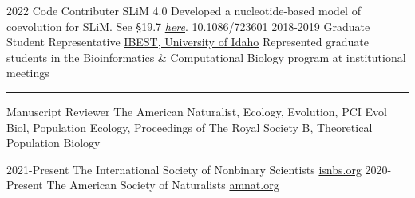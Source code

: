 \documentclass[9pt]{developercv} %
\begin{document}
\vspace{-10 pt}
\begin{publist}
    \pub
    {2022}
    {Code Contributer}
    {SLiM 4.0}
    {Developed a nucleotide-based model of coevolution for SLiM. See §19.7 \href{https://github.com/MesserLab/SLiM/releases/download/v4.0.1/SLiM_Manual.pdf}{\emph{here}}.}
    {10.1086/723601}
    \entry
    {2018-2019}
    {Graduate Student Representative}
    {\href{https://www.iids.uidaho.edu/about.php}{IBEST, University of Idaho}}
    {Represented graduate students in the Bioinformatics \& Computational Biology program at institutional meetings}
    \entry
    {\rule{0.6cm}{0.1pt}}
    {Manuscript Reviewer}
    {}
    {The American Naturalist, Ecology, Evolution, PCI Evol Biol, Population Ecology, Proceedings of The Royal Society B, Theoretical Population Biology}
\end{publist}

\vspace{-10 pt}
\begin{entrylist}
    \vspace{-10 pt}
    \entry
    {2021-Present}
    {The International Society of Nonbinary Scientists}
    {\href{https://isnbs.org/}{isnbs.org}}
    {}
    \vspace{-10 pt}
    \entry
    {2020-Present}
    {The American Society of Naturalists}
    {\href{https://www.amnat.org/home.html}{amnat.org}}
    {}
\end{entrylist}

\end{document}
